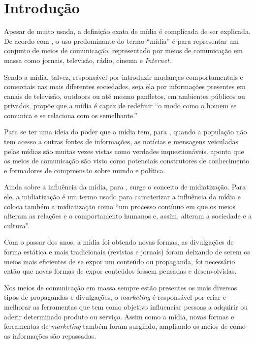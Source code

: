 \chapter[Introdução]{Introdução}
Apesar de muito usada, a definição exata de mídia é complicada de ser explicada. De acordo com \cite[p.49]{guazina2007}, o uso predominante do termo ``mídia'' é para representar um conjunto de meios de comunicação, representado por meios de comunicação em massa como jornais, televisão, rádio, cinema e \textit{Internet}.

Sendo a mídia, talvez, responsável por introduzir mudanças comportamentais e comerciais nas mais diferentes sociedades, seja ela por informações presentes em canais de televisão, outdoors ou até mesmo panfletos, em ambientes públicos ou privados, \cite[p.3]{escobar2007} propõe que a mídia é capaz de redefinir ``o modo como o homem se comunica e se relaciona com os semelhante.''

Para se ter uma ideia do poder que a mídia tem, para \cite{silva2007}, quando a população não tem acesso a outras fontes de informações, as notícias e mensagens veiculadas pelas mídias são muitas vezes vistas como verdades inquestionáveis. \cite[p.53]{guazina2007} aponta que os meios de comunicação são visto como potenciais construtores de conhecimento e formadores de compreensão sobre mundo e política.

Ainda sobre a influência da mídia, para \cite[p.54]{hjarvard2012}, surge o conceito de midiatização. Para ele, a midiatização é um termo usado para caracterizar a influência da mídia e coloca também a midiatização como ``um processo contínuo em que os meios alteram as relações e o comportamento humanos e, assim, alteram a sociedade e a cultura''. 

Com o passar dos anos, a mídia foi obtendo novas formas, as divulgações de forma estática e mais tradicionais (revistas e jornais) foram deixando de serem os meios mais eficientes de se expor um conteúdo ou propaganda, foi necessário então que novas formas de expor conteúdos fossem pensadas e desenvolvidas.

Nos meios de comunicação em massa sempre estão presentes os mais diversos tipos de propagandas e divulgações, o \textit{marketing} é responsável por criar e melhorar as ferramentas que tem como objetivo influenciar pessoas a adquirir ou aderir determinado produto ou serviço. Assim como a mídia, novas formas e ferramentas de \textit{marketing} também foram surgindo, ampliando os meios de como as informações são repassadas. 

